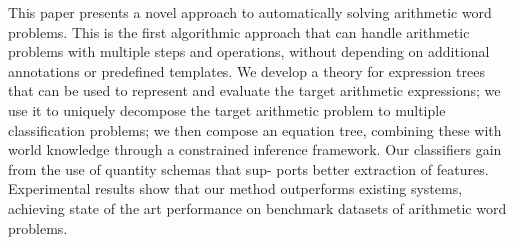 This paper presents a novel approach to automatically solving arithmetic word problems. This is the first algorithmic approach that can handle arithmetic problems with multiple steps and operations, without depending on additional annotations or predefined templates. We develop a theory for expression trees that can be used to represent and evaluate the target arithmetic expressions; we use it to uniquely decompose the target arithmetic problem to multiple classification problems; we then compose an equation tree, combining these with world knowledge through a constrained inference framework. Our classifiers gain from the use of quantity schemas that sup- ports better extraction of features. Experimental results show that our method outperforms existing systems, achieving state of the art performance on benchmark datasets of arithmetic word problems.
